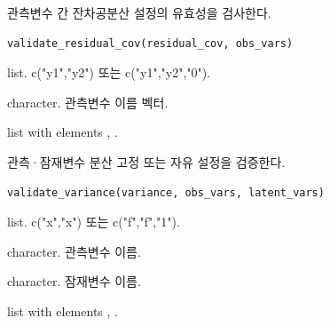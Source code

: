 \documentclass[a4paper]{book}
\begin{document}
%
\begin{Description}
관측변수 간 잔차공분산 설정의 유효성을 검사한다.
\end{Description}
%
\begin{Usage}
\begin{verbatim}
validate_residual_cov(residual_cov, obs_vars)
\end{verbatim}
\end{Usage}
%
\begin{Arguments}
\begin{ldescription}
\item[\code{residual\_cov}] list. c("y1","y2") 또는 c("y1","y2","0").

\item[\code{obs\_vars}] character. 관측변수 이름 벡터.
\end{ldescription}
\end{Arguments}
%
\begin{Value}
list with elements , .
\end{Value}

%
\begin{Description}
관측·잠재변수 분산 고정 또는 자유 설정을 검증한다.
\end{Description}
%
\begin{Usage}
\begin{verbatim}
validate_variance(variance, obs_vars, latent_vars)
\end{verbatim}
\end{Usage}
%
\begin{Arguments}
\begin{ldescription}
\item[\code{variance}] list. c("x","x") 또는 c("f","f","1").

\item[\code{obs\_vars}] character. 관측변수 이름.

\item[\code{latent\_vars}] character. 잠재변수 이름.
\end{ldescription}
\end{Arguments}
%
\begin{Value}
list with elements , .
\end{Value}
\end{document}
